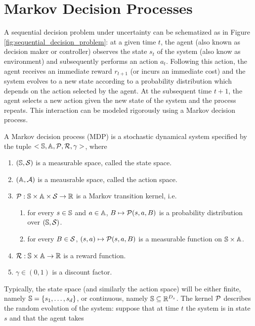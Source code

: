 \section{Markov Decision Processes}
A sequential decision problem under uncertainty can be schematized as in Figure
\ref{fig:sequential_decision_problem}: at a given time $t$, the agent (also
known as decision maker or controller) observes the state $s_t$ of the system 
(also know as environment) and subsequently performs an action $a_t$. Following
this action, the agent receives an immediate reward $r_{t+1}$ (or incurs an
immediate cost) and the system evolves to a new state according to a probability
distribution which depends on the action selected by the agent. At the
subsequent time $t+1$, the agent selects a new action given the new state of
the system and the process repeats. This interaction can be modeled rigorously
using a Markov decision process.  
\begin{definition}
	A Markov decision process (MDP) is a stochastic dynamical system specified by the tuple $<\S, \A, \calP, \calR,
	\gamma>$, where
	\begin{enumerate}[label={\roman*)}]
		\item $(\S, \calS)$ is a measurable space, called the state space.
		\item $(\A, \calA)$ is a meausrable space, called the action space. 
		\item $\calP: \S \times \A \times \calS \to \R$ is a Markov transition
			kernel, i.e.
			\begin{enumerate}[label={\alph*)}]
				\item for every $s\in\S$ and $a\in\A$, $B \mapsto \calP(s,a,B)$
					  is a probability distribution over $(\S, \calS)$.
				\item for every $B\in\calS$, $(s,a) \mapsto \calP(s,a,B)$ is
					  a measurable function on $\S \times \A$.
			\end{enumerate}
		\item $\calR: \S \times \A \to \R$ is a reward function.
		\item $\gamma \in (0,1)$ is a discount factor.
	\end{enumerate}
\end{definition}
Typically, the state space (and similarly the action space) will be either
finite, namely $\S = \{s_1, \ldots, s_d\}$, or continuous, namely $\S \subseteq
\R^{D_s}$. The kernel $\calP$ describes the random evolution of the system:
suppose that at time $t$ the system is in state $s$ and that the agent takes
